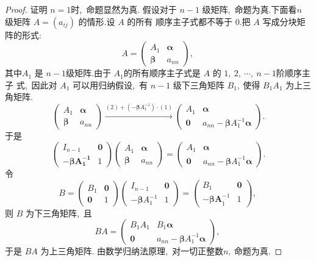 \begin{proof}
	证明 $ n=1  $时,\  命题显然为真.
	假设对于 $ n-1 $ 级矩阵,\ 命题为真.下面看$  n $ 级矩阵 $ A=\left(a_{i j}\right) $ 的情形.设  $A $ 的所有 顺序主子式都不等于 $0.$把 $ A $ 写成分块矩阵的形式:
	$$A=\left(\begin{array}{cc}
		A_{1} & \boldsymbol{\alpha} \\
		\boldsymbol{\beta} & a_{n n}
	\end{array}\right),\ $$
	其中$  A_{1} $ 是 $ n-1  $级矩阵.由于 $ A_{1}  $的所有顺序主子式是 $ A $ 的 $ 1,\ 2,\  \cdots,\  n-1  $阶顺序主子 式,\  因此对  $A_{1} $ 可以用归纳假设,\  有 $ n-1$  级下三角矩阵 $ B_{1} ,\  $使得  $B_{1} A_{1} $ 为上三角矩阵.
	$$\left(\begin{array}{cc}
		A_{1} & \boldsymbol{\alpha} \\
		\boldsymbol{\beta} & a_{n n}
	\end{array}\right) \xrightarrow{(2)+\left(-\boldsymbol{\beta} A_{1}^{-1}\right) \cdot(1)}\left(\begin{array}{cc}
		A_{1} & \boldsymbol{\alpha} \\
		\mathbf{0} & a_{n n}-\boldsymbol{\beta} A_{1}^{-1} \boldsymbol{\alpha}
	\end{array}\right) .$$
	于是
	$$\left(\begin{array}{cc}
		I_{n-1} & \mathbf{0} \\
		-\boldsymbol{\beta A _ { 1 } ^ { - 1 }} & 1
	\end{array}\right)\left(\begin{array}{cc}
		A_{1} & \boldsymbol{\alpha} \\
		\boldsymbol{\beta} & a_{n n}
	\end{array}\right)=\left(\begin{array}{cc}
		A_{1} & \boldsymbol{\alpha} \\
		\mathbf{0} & a_{n n}-\boldsymbol{\beta} A_{1}^{-1} \boldsymbol{\alpha}
	\end{array}\right) .$$
	令
	$$B=\left(\begin{array}{cc}
		B_{1} & \mathbf{0} \\
		\mathbf{0} & 1
	\end{array}\right)\left(\begin{array}{cc}
		I_{n-1} & \mathbf{0} \\
		-\boldsymbol{\beta} A_{1}^{-1} & 1
	\end{array}\right)=\left(\begin{array}{ll}
		B_{1} & \mathbf{0} \\
		-\boldsymbol{\beta A}_{1}^{-1} & 1
	\end{array}\right),\ $$
	则 $ B $ 为下三角矩阵,\  且 
	$$ B A=\left(\begin{array}{cc}B_{1} A_{1} & B_{1} \boldsymbol{\alpha} \\ \mathbf{0} & a_{n n}-\boldsymbol{\beta} A_{1}^{-1} \boldsymbol{\alpha}\end{array}\right) ,\ $$
	于是  $B A $ 为上三角矩阵.
	由数学归纳法原理,\  对一切正整数$  n ,\  $命题为真.
\end{proof}

